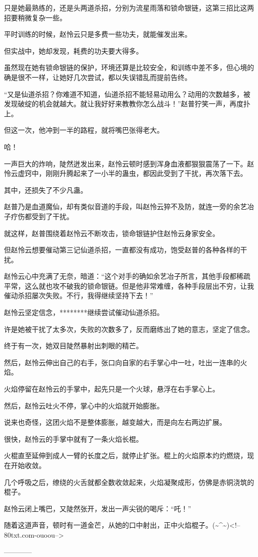 \begin{this_body}
只是她最熟练的，还是头两道杀招，分别为流星雨落和锁命银链，这第三招比这两招要稍微复杂一些。

平时训练的时候，赵怜云只是多费一些功夫，就能催发出来。

但实战中，她却发现，耗费的功夫要大得多。

虽然现在她有锁命银链的保护，环境还算是比较安全，和训练中差不多，但心境的确是很不一样，让她好几次尝试，都以失误错乱而提前告终。

“又是仙道杀招？你难道不知道，仙道杀招不能轻易动用么？动用的次数越多，被发现破绽的机会就越大。就让我好好来教教你怎么战斗！”赵普狞笑一声，再度扑上。

但这一次，他冲到一半的路程，就将嘴巴张得老大。

哈！

一声巨大的炸响，陡然迸发出来，赵怜云顿时感到浑身血液都狠狠震荡了一下。赵怜云虚窍中，刚刚升腾起来了一小半的蛊虫，都因此受到了干扰，再次落下去。

其中，还损失了不少凡蛊。

赵普乃是血道魔仙，却有类似音道的手段，叫赵怜云猝不及防，就连一旁的余艺冶子疗伤都受到了干扰。

就这样，赵普围绕着赵怜云不断攻击，锁命银链护住赵怜云身家安全。

但赵怜云想要催动第三记仙道杀招，一直都没有成功，饱受赵普的各种各样的干扰。

赵怜云心中充满了无奈，暗道：“这个对手的确如余艺冶子所言，其他手段都稀疏平常，这么就也攻不破我的锁命银链。但是他非常难缠，各种手段层出不穷，让我催动杀招屡次失败。不行，我得继续坚持下去！”

赵怜云坚定信念，********继续尝试催动仙道杀招。

许是她被干扰了太多次，失败的次数多了，反而磨练出了她的意志，坚定了信念。

终于有一次，她双目陡然暴射出刺眼的精芒。

然后，赵怜云伸出自己的右手，张口向自家的右手掌心中一吐，吐出一连串的火焰。

火焰停留在赵怜云的手掌中，起先只是一个火球，悬浮在右手掌心上。

然后，赵怜云吐火不停，掌心中的火焰就开始膨胀。

说来也奇怪，这团火焰不是整体膨胀，越变越大，而是向左右两边扩展。

很快，赵怜云的手掌中就有了一条火焰长棍。

火棍直至延伸到成人一臂的长度之后，就停止扩张。棍上的火焰原本灼灼燃烧，现在开始收敛。

几个呼吸之后，缭绕的火舌就都全数收敛起来，火焰凝聚成形，仿佛是赤铜浇筑的棍子。

赵怜云闭上嘴巴，又陡然张开，发出一声尖锐的喝斥：“吒！”

随着这道声音，顿时有一道金芒，从她的口中射出，正中火焰棍子。(\~{}\^{}\~{})<!--80txt.com-ouoou-->

------------

\end{this_body}

